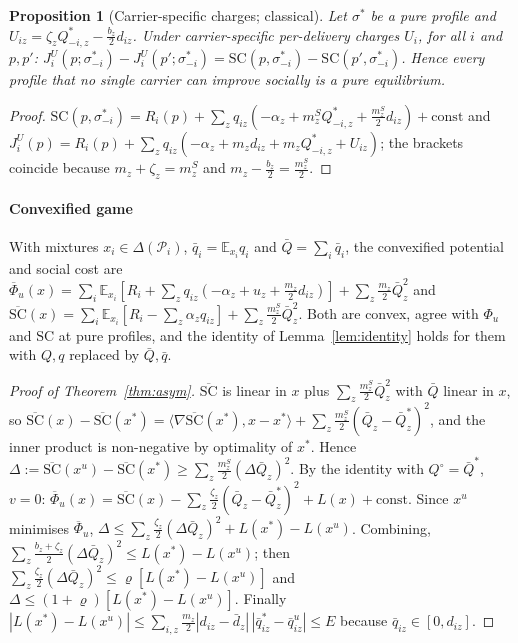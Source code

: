 \documentclass[preprint,12pt]{elsarticle}
\newtheorem{proposition}[theorem]{Proposition}
\theoremstyle{definition}
\theoremstyle{remark}
\newcommand{\E}{\mathbb{E}}
\newcommand{\ip}[2]{\langle #1,#2\rangle}
\begin{document}
\begin{proposition}[Carrier-specific charges; classical]\label{prop:pers}
Let $\sigma^*$ be a pure profile and $U_{iz}=\zeta_zQ^*_{-i,z}-\tfrac{b_z}{2}d_{iz}$. Under carrier-specific per-delivery charges $U_i$, for all $i$ and $p,p'$: $J^U_i(p;\sigma^*_{-i})-J^U_i(p';\sigma^*_{-i})=\mathrm{SC}(p,\sigma^*_{-i})-\mathrm{SC}(p',\sigma^*_{-i})$. Hence every profile that no single carrier can improve socially is a pure equilibrium.
\end{proposition}
\begin{proof}
$\mathrm{SC}(p,\sigma^*_{-i})=R_i(p)+\sum_zq_{iz}(-\alpha_z+m^S_zQ^*_{-i,z}+\tfrac{m^S_z}{2}d_{iz})+\text{const}$ and $J^U_i(p)=R_i(p)+\sum_zq_{iz}(-\alpha_z+m_zd_{iz}+m_zQ^*_{-i,z}+U_{iz})$; the brackets coincide because $m_z+\zeta_z=m^S_z$ and $m_z-\tfrac{b_z}{2}=\tfrac{m^S_z}{2}$.
\end{proof}

\paragraph{Convexified game} With mixtures $x_i\in\Delta(\mathcal P_i)$, $\bar q_i=\E_{x_i}q_i$ and $\bar Q=\sum_i\bar q_i$, the convexified potential and social cost are
$\overline\Phi_u(x)=\sum_i\E_{x_i}[R_i+\sum_zq_{iz}(-\alpha_z+u_z+\tfrac{m_z}{2}d_{iz})]+\sum_z\tfrac{m_z}{2}\bar Q_z^2$ and
$\overline{\mathrm{SC}}(x)=\sum_i\E_{x_i}[R_i-\sum_z\alpha_zq_{iz}]+\sum_z\tfrac{m^S_z}{2}\bar Q_z^2$. Both are convex, agree with $\Phi_u$ and $\mathrm{SC}$ at pure profiles, and the identity of Lemma~\ref{lem:identity} holds for them with $Q,q$ replaced by $\bar Q,\bar q$.

\begin{proof}[Proof of Theorem~\ref{thm:asym}]
$\overline{\mathrm{SC}}$ is linear in $x$ plus $\sum_z\tfrac{m^S_z}{2}\bar Q_z^2$ with $\bar Q$ linear in $x$, so $\overline{\mathrm{SC}}(x)-\overline{\mathrm{SC}}(x^*)=\ip{\nabla\overline{\mathrm{SC}}(x^*)}{x-x^*}+\sum_z\tfrac{m^S_z}{2}(\bar Q_z-\bar Q^*_z)^2$, and the inner product is non-negative by optimality of $x^*$. Hence $\Delta:=\overline{\mathrm{SC}}(x^u)-\overline{\mathrm{SC}}(x^*)\ge\sum_z\tfrac{m^S_z}{2}(\Delta\bar Q_z)^2$. By the identity with $Q^\circ=\bar Q^*$, $v=0$: $\overline\Phi_u(x)=\overline{\mathrm{SC}}(x)-\sum_z\tfrac{\zeta_z}{2}(\bar Q_z-\bar Q^*_z)^2+L(x)+\text{const}$. Since $x^u$ minimises $\overline\Phi_u$, $\Delta\le\sum_z\tfrac{\zeta_z}{2}(\Delta\bar Q_z)^2+L(x^*)-L(x^u)$. Combining, $\sum_z\tfrac{b_z+\zeta_z}{2}(\Delta\bar Q_z)^2\le L(x^*)-L(x^u)$; then $\sum_z\tfrac{\zeta_z}{2}(\Delta\bar Q_z)^2\le\varrho[L(x^*)-L(x^u)]$ and $\Delta\le(1+\varrho)[L(x^*)-L(x^u)]$. Finally $|L(x^*)-L(x^u)|\le\sum_{i,z}\tfrac{m_z}{2}|d_{iz}-\bar d_z|\,|\bar q^*_{iz}-\bar q^u_{iz}|\le E$ because $\bar q_{iz}\in[0,d_{iz}]$.
\end{proof}
\end{document}
